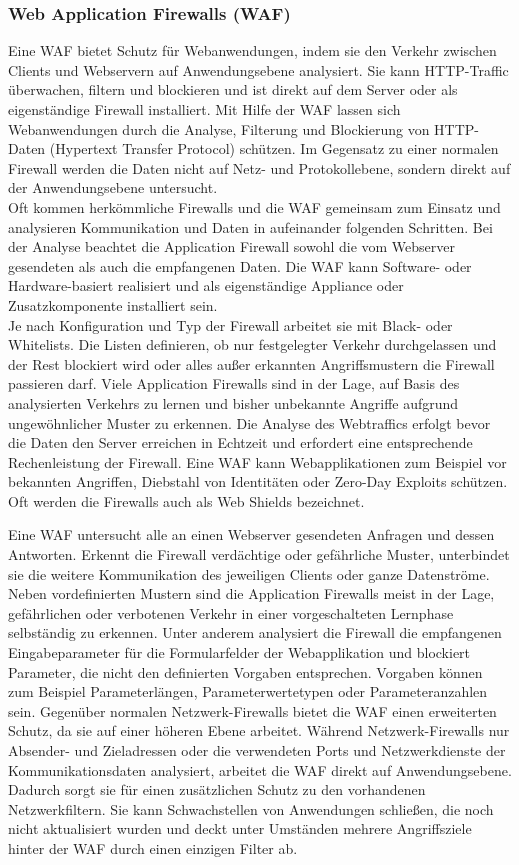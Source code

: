 \documentclass[12pt,oneside,a4paper,parskip]{scrbook}
\begin{document}
    \subsubsection{Web Application Firewalls (WAF)}
    Eine WAF bietet Schutz für Webanwendungen, indem sie den Verkehr zwischen Clients und Webservern auf Anwendungsebene analysiert. Sie kann HTTP-Traffic überwachen, filtern und blockieren und ist direkt auf dem Server oder als eigenständige Firewall installiert.
    Mit Hilfe der WAF lassen sich Webanwendungen durch die Analyse, Filterung und Blockierung von HTTP-Daten (Hypertext Transfer Protocol) schützen. Im Gegensatz zu einer normalen Firewall werden die Daten nicht auf Netz- und Protokollebene, sondern direkt auf der Anwendungsebene untersucht.\\
    Oft kommen herkömmliche Firewalls und die WAF gemeinsam zum Einsatz und analysieren Kommunikation und Daten in aufeinander folgenden Schritten. Bei der Analyse beachtet die Application Firewall sowohl die vom Webserver gesendeten als auch die empfangenen Daten. Die WAF kann Software- oder Hardware-basiert realisiert und als eigenständige Appliance oder Zusatzkomponente installiert sein. \\
    Je nach Konfiguration und Typ der Firewall arbeitet sie mit Black- oder Whitelists. Die Listen definieren, ob nur festgelegter Verkehr durchgelassen und der Rest blockiert wird oder alles außer erkannten Angriffsmustern die Firewall passieren darf. Viele Application Firewalls sind in der Lage, auf Basis des analysierten Verkehrs zu lernen und bisher unbekannte Angriffe aufgrund ungewöhnlicher Muster zu erkennen. Die Analyse des Webtraffics erfolgt bevor die Daten den Server erreichen in Echtzeit und erfordert eine entsprechende Rechenleistung der Firewall. Eine WAF kann Webapplikationen zum Beispiel vor bekannten Angriffen, Diebstahl von Identitäten oder Zero-Day Exploits schützen. Oft werden die Firewalls auch als Web Shields bezeichnet.

    Eine WAF untersucht alle an einen Webserver gesendeten Anfragen und dessen Antworten. Erkennt die Firewall verdächtige oder gefährliche Muster, unterbindet sie die weitere Kommunikation des jeweiligen Clients oder ganze Datenströme. Neben vordefinierten Mustern sind die Application Firewalls meist in der Lage, gefährlichen oder verbotenen Verkehr in einer vorgeschalteten Lernphase selbständig zu erkennen. Unter anderem analysiert die Firewall die empfangenen Eingabeparameter für die Formularfelder der Webapplikation und blockiert Parameter, die nicht den definierten Vorgaben entsprechen. Vorgaben können zum Beispiel Parameterlängen, Parameterwertetypen oder Parameteranzahlen sein. Gegenüber normalen Netzwerk-Firewalls bietet die WAF einen erweiterten Schutz, da sie auf einer höheren Ebene arbeitet. Während Netzwerk-Firewalls nur Absender- und Zieladressen oder die verwendeten Ports und Netzwerkdienste der Kommunikationsdaten analysiert, arbeitet die WAF direkt auf Anwendungsebene. Dadurch sorgt sie für einen zusätzlichen Schutz zu den vorhandenen Netzwerkfiltern. Sie kann Schwachstellen von Anwendungen schließen, die noch nicht aktualisiert wurden und deckt unter Umständen mehrere Angriffsziele hinter der WAF durch einen einzigen Filter ab.
\end{document}
